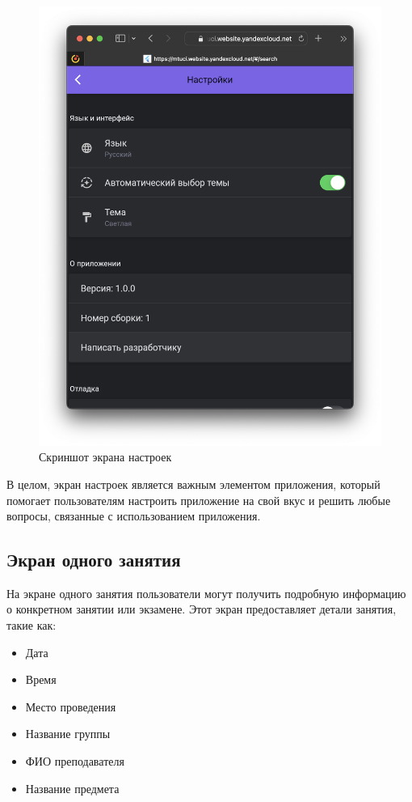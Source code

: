 \begin{figure}[h]
\centering
\includegraphics[width=0.8\linewidth]{images/settings_screen.png}
\caption{Скриншот экрана настроек}
\label{fig:mpr}
\end{figure}

В целом, экран настроек является важным элементом приложения,
который помогает пользователям настроить приложение на свой вкус и
решить любые вопросы, связанные с использованием приложения.

\subsection{Экран одного занятия}
На экране одного занятия пользователи могут получить подробную информацию о конкретном занятии или экзамене.
Этот экран предоставляет детали занятия,
такие как:
\begin{itemize}
    \item Дата
    \item Время
    \item Место проведения
    \item Название группы
    \item ФИО преподавателя
    \item Название предмета
\end{itemize}

